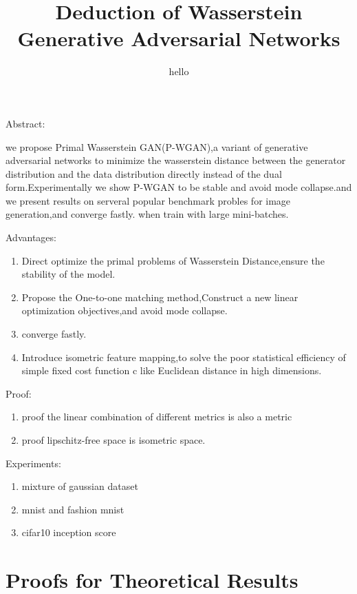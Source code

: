 \documentclass[letterpaper]{article} %
\begin{document}
	\title{Deduction of Wasserstein Generative Adversarial Networks}
	\author{hello
	}
	\maketitle
	
	
	
	

	
Abstract:

we propose Primal Wasserstein GAN(P-WGAN),a variant of generative adversarial networks to minimize the wasserstein distance between the generator distribution and the data distribution directly instead of the dual form.Experimentally we show P-WGAN to be stable and avoid mode collapse.and we present results on serveral popular benchmark probles for image generation,and converge fastly.
when train with large mini-batches.
	
Advantages:
\begin{enumerate}
	\item Direct optimize the primal problems of Wasserstein Distance,ensure the stability of the model.
	\item Propose the One-to-one matching method,Construct a new linear optimization objectives,and avoid mode collapse. 
	\item converge fastly.
	\item Introduce isometric feature mapping,to solve the poor statistical efficiency of simple fixed cost function c like Euclidean distance in high dimensions.
\end{enumerate}
Proof:
\begin{enumerate}
	\item proof the linear combination of different metrics is also a metric 
	\item proof lipschitz-free space is isometric space.
\end{enumerate}
Experiments:
\begin{enumerate}
	\item mixture of gaussian dataset
	\item mnist and fashion mnist
	\item cifar10 inception score
\end{enumerate}
	\section{Proofs for Theoretical Results}
	
\end{document}
